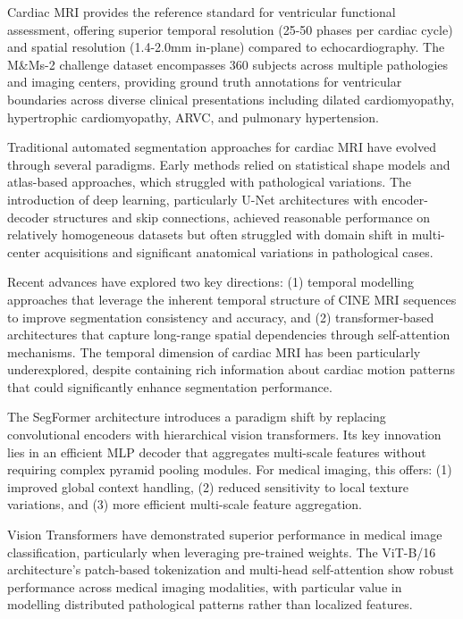 \documentclass[twoside,11pt]{article}
\begin{document}
  Cardiac MRI provides the reference standard for ventricular functional assessment, offering superior temporal resolution (25-50 phases per cardiac cycle) and spatial resolution (1.4-2.0mm in-plane) compared to echocardiography. The M\&Ms-2 challenge dataset encompasses 360 subjects across multiple pathologies and imaging centers, providing ground truth annotations for ventricular boundaries across diverse clinical presentations including dilated cardiomyopathy, hypertrophic cardiomyopathy, ARVC, and pulmonary hypertension.
  
  Traditional automated segmentation approaches for cardiac MRI have evolved through several paradigms. Early methods relied on statistical shape models and atlas-based approaches, which struggled with pathological variations. The introduction of deep learning, particularly U-Net architectures with encoder-decoder structures and skip connections, achieved reasonable performance on relatively homogeneous datasets but often struggled with domain shift in multi-center acquisitions and significant anatomical variations in pathological cases.
  
  Recent advances have explored two key directions: (1) temporal modelling approaches that leverage the inherent temporal structure of CINE MRI sequences to improve segmentation consistency and accuracy, and (2) transformer-based architectures that capture long-range spatial dependencies through self-attention mechanisms. The temporal dimension of cardiac MRI has been particularly underexplored, despite containing rich information about cardiac motion patterns that could significantly enhance segmentation performance.
  
  The SegFormer architecture introduces a paradigm shift by replacing convolutional encoders with hierarchical vision transformers. Its key innovation lies in an efficient MLP decoder that aggregates multi-scale features without requiring complex pyramid pooling modules. For medical imaging, this offers: (1) improved global context handling, (2) reduced sensitivity to local texture variations, and (3) more efficient multi-scale feature aggregation.
  
  Vision Transformers have demonstrated superior performance in medical image classification, particularly when leveraging pre-trained weights. The ViT-B/16 architecture's patch-based tokenization and multi-head self-attention show robust performance across medical imaging modalities, with particular value in modelling distributed pathological patterns rather than localized features.
\end{document}
